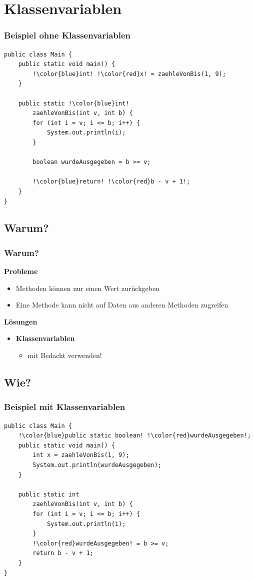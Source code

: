 \documentclass[final]{beamer}
\begin{document}
\section{Klassenvariablen}
\begin{frame}[containsverbatim]
	\frametitle{Beispiel ohne Klassenvariablen}
	\begin{lstlisting}[escapechar=!]
public class Main {
	public static void main() {
		!\color{blue}int! !\color{red}x! = zaehleVonBis(1, 9);
	}
	
	public static !\color{blue}int! 
		zaehleVonBis(int v, int b) {
		for (int i = v; i <= b; i++) {
			System.out.println(i);
		}
		
		boolean wurdeAusgegeben = b >= v;
		
		!\color{blue}return! !\color{red}b - v + 1!;
	}
}
	\end{lstlisting}
\end{frame}

\subsection{Warum?}
\begin{frame}
	\frametitle{Warum?}
	\textbf{Probleme}
	\begin{itemize}
		\item{Methoden können nur einen Wert zurückgeben}
		\item{Eine Methode kann nicht auf Daten aus anderen Methoden zugreifen}
	\end{itemize}
	\vspace{\baselineskip}
	\pause
	\textbf{Lösungen}
	\pause
	\begin{itemize}
		\item{\textbf{Klassenvariablen}
			\begin{itemize}
				\item{mit Bedacht verwenden!}
			\end{itemize}
		}
	\end{itemize}
\end{frame}
	
\subsection{Wie?}
\begin{frame}[containsverbatim]
	\frametitle{Beispiel mit Klassenvariablen}
	\begin{lstlisting}[escapechar=!]
public class Main {
	!\color{blue}public static boolean! !\color{red}wurdeAusgegeben!;
	public static void main() {
		int x = zaehleVonBis(1, 9);
		System.out.println(wurdeAusgegeben);
	}
	
	public static int 
		zaehleVonBis(int v, int b) {
		for (int i = v; i <= b; i++) {
			System.out.println(i);
		}
		!\color{red}wurdeAusgegeben! = b >= v;
		return b - v + 1;
	}
}
	\end{lstlisting}
\end{frame}
\end{document}
